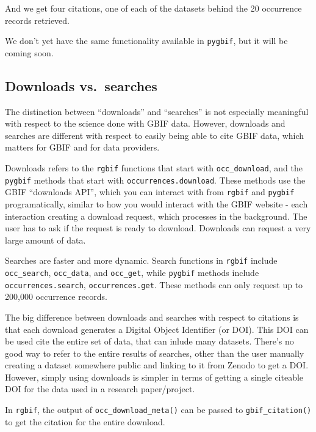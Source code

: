 \documentclass[3p]{elsarticle} %
\begin{document}
And we get four citations, one of each of the datasets behind the 20
occurrence records retrieved.

We don't yet have the same functionality available in \texttt{pygbif},
but it will be coming soon.

\hypertarget{downloads-vs.-searches}{%
\subsection{Downloads vs.~searches}\label{downloads-vs.-searches}}

The distinction between ``downloads'' and ``searches'' is not especially
meaningful with respect to the science done with GBIF data. However,
downloads and searches are different with respect to easily being able
to cite GBIF data, which matters for GBIF and for data providers.

Downloads refers to the \texttt{rgbif} functions that start with
\texttt{occ\_download}, and the \texttt{pygbif} methods that start with
\texttt{occurrences.download}. These methods use the GBIF ``downloads
API'', which you can interact with from \texttt{rgbif} and
\texttt{pygbif} programatically, similar to how you would interact with
the GBIF website - each interaction creating a download request, which
processes in the background. The user has to ask if the request is ready
to download. Downloads can request a very large amount of data.

Searches are faster and more dynamic. Search functions in \texttt{rgbif}
include \texttt{occ\_search}, \texttt{occ\_data}, and \texttt{occ\_get},
while \texttt{pygbif} methods include \texttt{occurrences.search},
\texttt{occurrences.get}. These methods can only request up to 200,000
occurrence records.

The big difference between downloads and searches with respect to
citations is that each download generates a Digital Object Identifier
(or DOI). This DOI can be used cite the entire set of data, that can
inlude many datasets. There's no good way to refer to the entire results
of searches, other than the user manually creating a dataset somewhere
public and linking to it from Zenodo to get a DOI. However, simply using
downloads is simpler in terms of getting a single citeable DOI for the
data used in a research paper/project.

In \texttt{rgbif}, the output of \texttt{occ\_download\_meta()} can be
passed to \texttt{gbif\_citation()} to get the citation for the entire
download.
\end{document}
